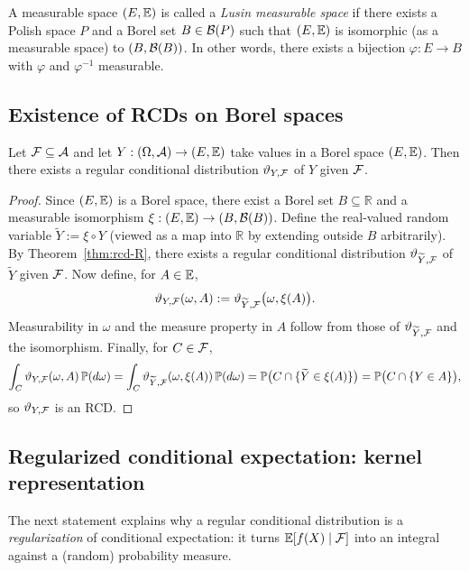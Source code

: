 \begin{definition}
A measurable space $(E,\mathbb{E})$ is called a \emph{Lusin measurable space} if there exists a Polish space $P$
and a Borel set $B\in\mathcal{B}(P)$ such that $(E,\mathbb{E})$ is isomorphic (as a measurable space) to $(B,\mathcal{B}(B))$.
In other words, there exists a bijection $\varphi:E\to B$ with $\varphi$ and $\varphi^{-1}$ measurable.
\end{definition}

\subsection{Existence of RCDs on Borel spaces}

\begin{theorem}
\label{thm:rcd-borel}
Let $\mathcal{F}\subseteq\mathcal{A}$ and let $Y:(\Omega,\mathcal{A})\to(E,\mathbb{E})$ take values in a Borel space $(E,\mathbb{E})$.
Then there exists a regular conditional distribution $\vartheta_{Y,\mathcal{F}}$ of $Y$ given $\mathcal{F}$.
\end{theorem}

\begin{proof}
Since $(E,\mathbb{E})$ is a Borel space, there exist a Borel set $B\subseteq\mathbb{R}$ and a measurable isomorphism
$\xi:(E,\mathbb{E})\to(B,\mathcal{B}(B))$.
Define the real-valued random variable $\widetilde Y := \xi\circ Y$ (viewed as a map into $\mathbb{R}$ by extending outside $B$ arbitrarily).
By Theorem~\ref{thm:rcd-R}, there exists a regular conditional distribution $\vartheta_{\widetilde Y,\mathcal{F}}$ of $\widetilde Y$ given $\mathcal{F}$.
Now define, for $A\in\mathbb{E}$,
\[
\vartheta_{Y,\mathcal{F}}(\omega,A):=\vartheta_{\widetilde Y,\mathcal{F}}\big(\omega,\xi(A)\big).
\]
Measurability in $\omega$ and the measure property in $A$ follow from those of $\vartheta_{\widetilde Y,\mathcal{F}}$ and the isomorphism.
Finally, for $C\in\mathcal{F}$,
\[
\int_C \vartheta_{Y,\mathcal{F}}(\omega,A)\,\mathbb{P}(d\omega)
=\int_C \vartheta_{\widetilde Y,\mathcal{F}}(\omega,\xi(A))\,\mathbb{P}(d\omega)
=\mathbb{P}\big(C\cap\{\widetilde Y\in \xi(A)\}\big)
=\mathbb{P}\big(C\cap\{Y\in A\}\big),
\]
so $\vartheta_{Y,\mathcal{F}}$ is an RCD.
\end{proof}

\subsection{Regularized conditional expectation: kernel representation}

The next statement explains why a regular conditional distribution is a \emph{regularization} of conditional expectation:
it turns $\mathbb{E}[f(X)\mid \mathcal{F}]$ into an integral against a (random) probability measure.

